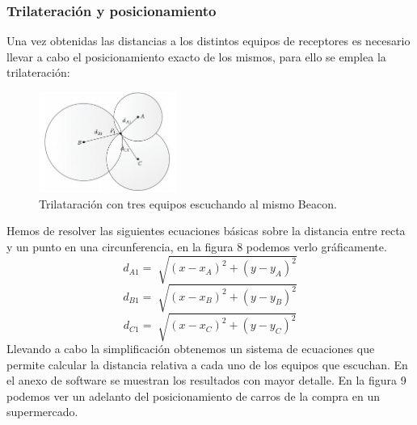 \documentclass[paper=a4, fontsize=11pt,twoside]{scrartcl}	%
\begin{document}
        \subsubsection{Trilateración y posicionamiento}
            Una vez obtenidas las distancias a los distintos equipos de receptores es necesario llevar a cabo el
            posicionamiento exacto de los mismos, para ello se emplea la trilateración:
            \begin{center}
                \begin{figure}[H]
                    \centering
                    \includegraphics[width=0.4\textwidth]{trilateration_circle.png}
                    \caption{Trilataración con tres equipos escuchando al mismo Beacon.}
                    \label{fig:mesh7}
                \end{figure}
            \end{center}
                Hemos de resolver las siguientes ecuaciones básicas sobre la distancia entre recta y un punto en 
                una circunferencia, en la figura 8 podemos verlo gráficamente.
                \begin{equation}
                    d_{A1}= \sqrt[]{(x-x_A)^2+(y-y_A)^2}
                \end{equation}
                \begin{equation}
                d_{B1}= \sqrt[]{(x-x_B)^2+(y-y_B)^2}
                \end{equation}
                \begin{equation}
                    d_{C1}= \sqrt[]{(x-x_C)^2+(y-y_C)^2}
                \end{equation}
                Llevando a cabo la simplificación obtenemos un sistema de ecuaciones que permite calcular la distancia
                relativa a cada uno de los equipos que escuchan. En el anexo de software se muestran los resultados con mayor 
                detalle. En la figura 9 podemos ver un adelanto del posicionamiento de carros de la compra en un supermercado.
\end{document}
